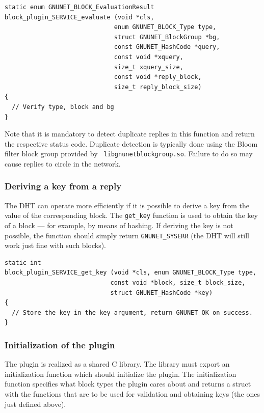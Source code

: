 \documentclass[10pt]{article}
\begin{document}
\lstset{language=C}
\begin{lstlisting}
static enum GNUNET_BLOCK_EvaluationResult
block_plugin_SERVICE_evaluate (void *cls,
                              enum GNUNET_BLOCK_Type type,
                              struct GNUNET_BlockGroup *bg,
                              const GNUNET_HashCode *query,
                              const void *xquery,
                              size_t xquery_size,
                              const void *reply_block,
                              size_t reply_block_size)
{
  // Verify type, block and bg
}
\end{lstlisting}

Note that it is mandatory to detect duplicate replies in this function
and return the respective status code.  Duplicate detection is
typically done using the Bloom filter block group provided by {\tt
  libgnunetblockgroup.so}.  Failure to do so may cause replies to
circle in the network.

\subsubsection{Deriving a key from a reply}

The DHT can operate more efficiently if it is possible to derive a key
from the value of the corresponding block.  The {\tt get\_key}
function is used to obtain the key of a block --- for example, by
means of hashing.  If deriving the key is not possible, the function
should simply return {\tt GNUNET\_SYSERR} (the DHT will still work
just fine with such blocks).

\lstset{language=C}
\begin{lstlisting}
static int
block_plugin_SERVICE_get_key (void *cls, enum GNUNET_BLOCK_Type type,
                             const void *block, size_t block_size,
                             struct GNUNET_HashCode *key)
{
  // Store the key in the key argument, return GNUNET_OK on success.
}
\end{lstlisting}

\subsubsection{Initialization of the plugin}

The plugin is realized as a shared C library.  The library must export
an initialization function which should initialize the plugin.  The
initialization function specifies what block types the plugin cares
about and returns a struct with the functions that are to be used for
validation and obtaining keys (the ones just defined above).
\end{document}
